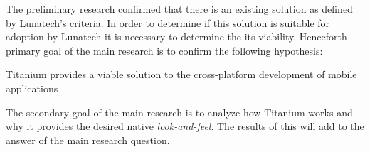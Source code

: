 
%
%




The preliminary research confirmed that there is an existing solution as defined by Lunatech's criteria. In order to determine if this solution is suitable for adoption by Lunatech it is necessary to determine the its viability.
Henceforth primary goal of the main research is to confirm the following hypothesis:
\begin{shadequote}
Titanium provides a viable solution to the cross-platform development of mobile applications%
\end{shadequote}

\noindent The secondary goal of the main research is to analyze how Titanium works and why it provides the desired native \emph{look-and-feel}. The results of this will add to the answer of the main research question.









